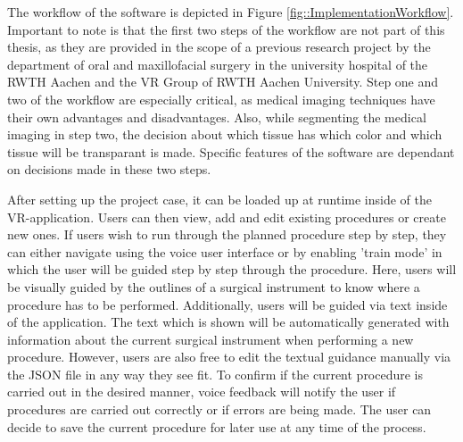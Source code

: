 The workflow of the software is depicted in Figure \ref{fig::ImplementationWorkflow}.
Important to note is that the first two steps of the workflow are not part of this thesis, as they are provided in the scope of a previous research project by the department of oral and maxillofacial surgery in the university hospital of the RWTH Aachen and the VR Group of RWTH Aachen University.
Step one and two of the workflow are especially critical, as medical imaging techniques have their own advantages and disadvantages.
Also, while segmenting the medical imaging in step two, the decision about which tissue has which color and which tissue will be transparant is made.
Specific features of the software are dependant on decisions made in these two steps.



After setting up the project case, it can be loaded up at runtime inside of the VR-application.
Users can then view, add and edit existing procedures or create new ones.
If users wish to run through the planned procedure step by step, they can either navigate using the voice user interface or by enabling 'train mode' in which the user will be guided step by step through the procedure.
Here, users will be visually guided by the outlines of a surgical instrument to know where a procedure has to be performed.
Additionally, users will be guided via text inside of the application.
The text which is shown will be automatically generated with information about the current surgical instrument when performing a new procedure.
However, users are also free to edit the textual guidance manually via the JSON file in any way they see fit.
To confirm if the current procedure is carried out in the desired manner, voice feedback will notify the user if procedures are carried out correctly or if errors are being made.
The user can decide to save the current procedure for later use at any time of the process.